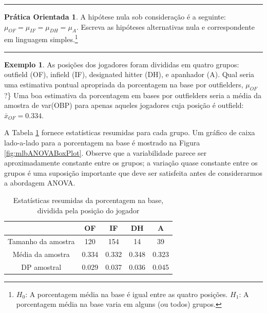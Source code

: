 \documentclass[
]{book}
\theoremstyle{definition}
\theoremstyle{definition}
\newtheorem{example}{Exemplo}[chapter]
\theoremstyle{definition}
\newtheorem{exercise}{Prática Orientada}[chapter]
\theoremstyle{definition}
\theoremstyle{remark}
\begin{document}
\begin{center}\rule{0.5\linewidth}{0.5pt}\end{center}

\begin{exercise}
\protect\hypertarget{exr:unnamed-chunk-221}{}{\label{exr:unnamed-chunk-221} }A hipótese nula sob consideração é a seguinte: \(\mu_{OF} = \mu_{IF} = \mu_{DH} = \mu_{A}\).
Escreva as hipóteses alternativas nula e correspondente em linguagem simples.\footnote{\(H_0\): A porcentagem média na base é igual entre as quatro posições. \(H_1\): A porcentagem média na base varia em alguns (ou todos) grupos.}
\end{exercise}

\begin{center}\rule{0.5\linewidth}{0.5pt}\end{center}

\begin{example}
\protect\hypertarget{exm:unnamed-chunk-222}{}{\label{exm:unnamed-chunk-222} }As posições dos jogadores foram divididas em quatro grupos: outfield (OF), infield (IF), designated hitter (DH), e apanhador (A). Qual seria uma estimativa pontual apropriada da porcentagem na base por outfielders, \(\mu_{OF}\)?\}
Uma boa estimativa da porcentagem em bases por outfielders seria a média da amostra de var(OBP) para apenas aqueles jogadores cuja posição é outfield: \(\bar{x}_{OF} = 0.334\).
\end{example}

A Tabela \ref{tab:mlbHRPerABSummaryTable} fornece estatísticas resumidas para cada grupo. Um gráfico de caixa lado-a-lado para a porcentagem na base é mostrado na Figura \ref{fig:mlbANOVABoxPlot}. Observe que a variabilidade parece ser aproximadamente constante entre os grupos; a variação quase constante entre os grupos é uma suposição importante que deve ser satisfeita antes de considerarmos a abordagem ANOVA.

\begin{table}

\caption{\label{tab:mlbHRPerABSummaryTable}Estatísticas resumidas da porcentagem na base, dividida pela posição do jogador}
\centering
\begin{tabular}[t]{c|c|c|c|c}
\hline
 & OF & IF & DH & A\\
\hline
Tamanho da amostra & 120 & 154 & 14 & 39\\
\hline
Média da amostra & 0.334 & 0.332 & 0.348 & 0.323\\
\hline
DP amostral & 0.029 & 0.037 & 0.036 & 0.045\\
\hline
\end{tabular}
\end{table}
\end{document}
